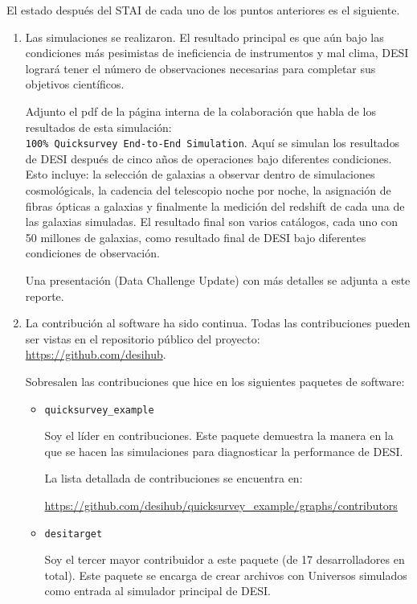 \documentclass[12pt,spanish]{article}
\begin{document}
El estado despu\'es del STAI de cada uno de los puntos anteriores es
el siguiente.

\begin{enumerate}
\item Las simulaciones se realizaron. 
  El resultado principal es que a\'un bajo las condiciones m\'as
  pesimistas de ineficiencia de instrumentos y mal clima, DESI
  lograr\'a tener el n\'umero de observaciones necesarias para
  completar sus objetivos cient\'ificos.

  Adjunto el pdf de la p\'agina
  interna de la colaboraci\'on que habla de los resultados de esta simulaci\'on:\\
  \verb"100% Quicksurvey End-to-End Simulation".
  Aqu\'i se simulan los resultados de DESI despu\'es de cinco a\~nos
  de operaciones bajo diferentes condiciones. Esto incluye: la
  selecci\'on de galaxias a observar 
  dentro de simulaciones cosmol\'ogicals, la cadencia del telescopio
  noche por noche, la asignaci\'on de fibras \'opticas a galaxias y
  finalmente la medici\'on del redshift de cada una de las galaxias
  simuladas. El resultado final son varios cat\'alogos, cada uno con
  50 millones de galaxias, como resultado final de DESI bajo
  diferentes condiciones de observaci\'on. 

  Una presentaci\'on (Data Challenge Update) con m\'as detalles se
  adjunta a este reporte. 
  
\item La contribuci\'on al software ha sido continua. Todas las
  contribuciones pueden ser vistas en el repositorio p\'ublico del
  proyecto:\\ \url{https://github.com/desihub}.

Sobresalen las contribuciones que hice en los siguientes paquetes de software:
\begin{itemize}
\item{\texttt{quicksurvey\_example}


  Soy el l\'ider en contribuciones. Este paquete demuestra la manera
  en la que se hacen las simulaciones para diagnosticar la performance
  de DESI.


  La lista detallada de contribuciones se encuentra en:


 \url{https://github.com/desihub/quicksurvey_example/graphs/contributors}}

\item \texttt{desitarget}

Soy el tercer mayor contribuidor a este paquete (de 17 desarrolladores
en total). Este paquete se encarga de crear archivos con Universos
simulados como entrada al simulador principal de DESI.


\end{itemize}
\end{enumerate}
\end{document}
